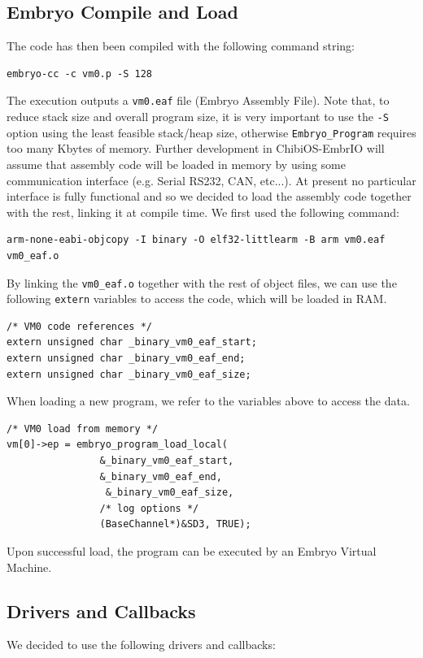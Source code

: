 \documentclass[a4paper,10pt]{article}
\begin{document}
\begin{multicols}{2}
\subsection{Embryo Compile and Load}

The code has then been compiled with the following command string:
\medskip
\lstset{language=bash}
\begin{lstlisting}[caption={compile command}]
embryo-cc -c vm0.p -S 128
\end{lstlisting}
\medskip
The execution outputs a \texttt{vm0.eaf} file (Embryo Assembly File). Note that, to reduce stack size and overall program size, it is very important to use the \texttt{-S} option using the least feasible stack/heap size, otherwise \texttt{Embryo\_Program} requires too many Kbytes of memory.
Further development in ChibiOS-EmbrIO will assume that assembly code will be loaded in memory by using some communication interface (e.g. Serial RS232, CAN, etc...). At present no particular interface is fully functional and so we decided to load the assembly code together with the rest, linking it at compile time. We first used the following command:
\medskip
\lstset{language=bash}
\begin{lstlisting}[caption={object code command}]
arm-none-eabi-objcopy -I binary -O elf32-littlearm -B arm vm0.eaf vm0_eaf.o
\end{lstlisting}
\medskip
By linking the \texttt{vm0\_eaf.o} together with the rest of object files, we can use the following \texttt{extern} variables to access the code, which will be loaded in RAM.
\medskip
\lstset{language=C}
\begin{lstlisting}[caption={code location variables}]
/* VM0 code references */
extern unsigned char _binary_vm0_eaf_start;
extern unsigned char _binary_vm0_eaf_end;
extern unsigned char _binary_vm0_eaf_size;
\end{lstlisting}
\medskip
When loading a new program, we refer to the variables above to access the data.
\medskip
\lstset{language=C}
\begin{lstlisting}[caption={Program load}]
/* VM0 load from memory */
vm[0]->ep = embryo_program_load_local(
				&_binary_vm0_eaf_start,
				&_binary_vm0_eaf_end,
				 &_binary_vm0_eaf_size,
				/* log options */
				(BaseChannel*)&SD3, TRUE);
\end{lstlisting}
\medskip
Upon successful load, the program can be executed by an Embryo Virtual Machine.

\subsection{Drivers and Callbacks}
We decided to use the following drivers and callbacks:


\end{multicols}
\end{document}
